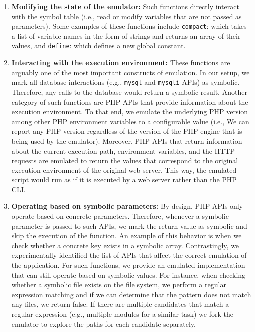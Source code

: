 \begin{enumerate}
    \item \textbf{Modifying the state of the emulator:} Such functions directly interact with the symbol table (i.e., read or modify variables that are not passed as parameters). Some examples of these functions include \texttt{compact}: which takes a list of variable names in the form of strings and returns an array of their values, and \texttt{define}: which defines a new global constant. 
    \item \textbf{Interacting with the execution environment:} These functions are arguably one of the most important constructs of emulation. In our setup, we mark all database interactions (e.g., \texttt{mysql} and \texttt{mysqli} APIs) as symbolic. Therefore, any calls to the database would return a symbolic result. Another category of such functions are PHP APIs that provide information about the execution environment. To that end, we emulate the underlying PHP version among other PHP environment variables to a configurable value (i.e., We can report any PHP version regardless of the version of the PHP engine that is being used by the emulator). Moreover, PHP APIs that return information about the current execution path, environment variables, and the HTTP requests are emulated to return the values that correspond to the original execution environment of the original web server. This way, the emulated script would run as if it is executed by a web server rather than the PHP CLI.
    \item \textbf{Operating based on symbolic parameters:} By design, PHP APIs only operate based on concrete parameters. Therefore, whenever a symbolic parameter is passed to such APIs, we mark the return value as symbolic and skip the execution of the function. An example of this behavior is when we check whether a concrete key exists in a symbolic array. Contrastingly, we experimentally identified the list of APIs that affect the correct emulation of the application. For such functions, we provide an emulated implementation that can still operate based on symbolic values. For instance, when checking whether a symbolic file exists on the file system, we perform a regular expression matching and if we can determine that the pattern does not match any files, we return false. If there are multiple candidates that match a regular expression (e.g., multiple modules for a similar task) we fork the emulator to explore the paths for each candidate separately. 
\end{enumerate}


